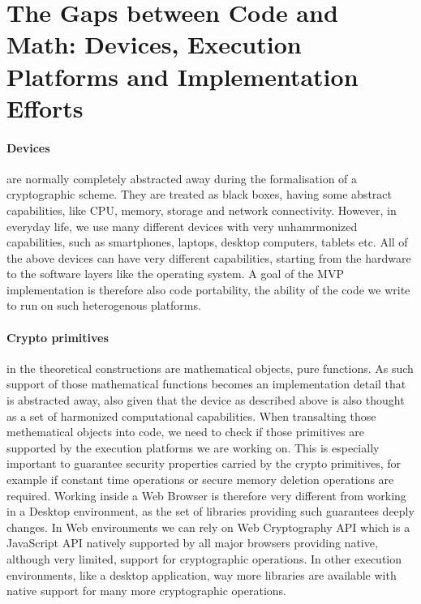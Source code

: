 \section{The Gaps between Code and Math: Devices, Execution Platforms and Implementation Efforts}

\paragraph{Devices} are normally completely abstracted away during the formalisation of a cryptographic scheme. 
They are treated as black boxes, having some abstract capabilities, like CPU, memory, storage and network connectivity.
However, in everyday life, we use many different devices with very unhamrmonized capabilities, such as smartphones, laptops, desktop computers, tablets etc.
All of the above devices can have very different capabilities, starting from the hardware to the software layers like the operating system.
A goal of the MVP implementation is therefore also code portability, the ability of the code we write to run on such heterogenous platforms.

\paragraph{Crypto primitives} in the theoretical constructions are mathematical objects, pure functions.
As such support of those mathematical functions becomes an implementation detail that is abstracted away, also given that the device as described above is also thought as a set of harmonized computational capabilities.
When transalting those methematical objects into code, we need to check if those primitives are supported by the execution platforms we are working on. 
This is especially important to guarantee security properties carried by the crypto primitives, for example if constant time operations or secure memory deletion operations are required.
Working inside a Web Browser is therefore very different from working in a Desktop environment, as the set of libraries providing such guarantees deeply changes. 
In Web environments we can rely on Web Cryptography API which is a JavaScript API natively supported by all major browsers providing native, although very limited, support for cryptographic operations.
In other execution environments, like a desktop application, way more libraries are available with native support for many more cryptographic operations.

